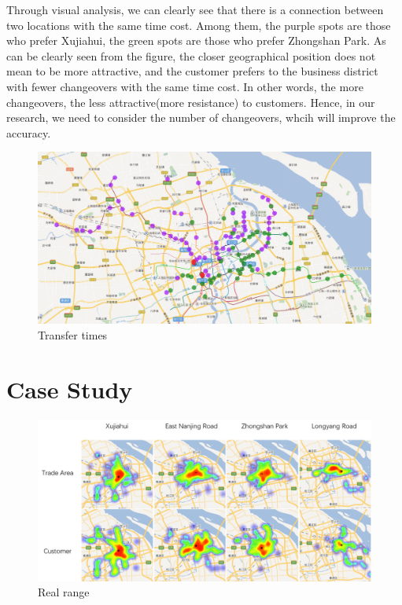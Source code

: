 \documentclass[journal,transmag]{IEEEtran}
\begin{document}
Through visual analysis, we can clearly see that there is a connection between two locations with the same time cost. Among them, the purple spots are those who prefer Xujiahui, the green spots are those who prefer Zhongshan Park. As can be clearly seen from the figure, the closer geographical position does not mean to be more attractive, and the customer prefers to the business district with fewer changeovers with the same time cost. In other words, the more changeovers, the less attractive(more resistance) to customers. Hence, in our research, we need to consider the number of changeovers, whcih will improve the accuracy.





\begin{figure}[tb]
\centering
\includegraphics[width=1\columnwidth]{figure10.png}
\caption{Transfer times}
\label{fig:Transfer-times}
\end{figure}



\section{Case Study}

\begin{figure}[tb]
\centering
\includegraphics[width=1\columnwidth]{figure11.png}
\caption{Real range}
\label{fig:Real-range}
\end{figure}
\end{document}
